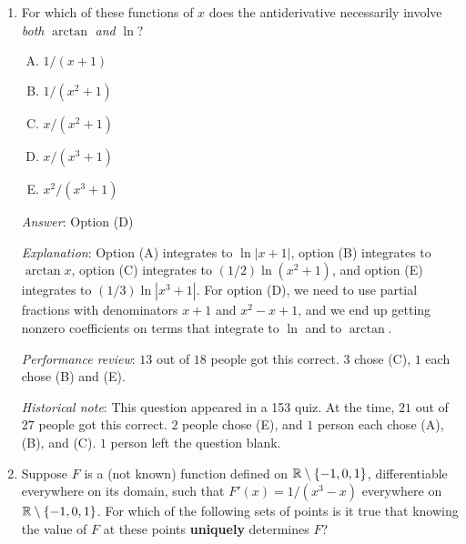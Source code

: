 \documentclass[10pt]{amsart}
\begin{document}
\begin{enumerate}
  {\em Performance review}: $6$ out of $18$ people got this
  correct. $3$ chose (A), $5$ chose (C), $2$ chose (E), $1$ chose (D),
  $1$ left the question blank.

  {\em Historical note}: This question appeared in a 153 quiz. At the
  time, $4$ out of $27$ people got this correct. $11$ people chose
  (A), $7$ people chose (C), $3$ people chose (D), $1$ person chose
  (E), and $1$ person left the question blank.

  Mainly, people confused the roles of the dummy variable $x$ (which
  gets integrated away) and the variable $k$.

\item For which of these functions of $x$ does the antiderivative
  necessarily involve {\em both} $\arctan$ {\em and} $\ln$?

  \begin{enumerate}[(A)]
  \item $1/(x + 1)$
  \item $1/(x^2 + 1)$
  \item $x/(x^2 + 1)$
  \item $x/(x^3 + 1)$
  \item $x^2/(x^3 + 1)$
  \end{enumerate}

  {\em Answer}: Option (D)

  {\em Explanation}: Option (A) integrates to $\ln|x+1|$, option (B)
  integrates to $\arctan x$, option (C) integrates to $(1/2) \ln(x^2 +
  1)$, and option (E) integrates to $(1/3) \ln|x^3 + 1|$. For option
  (D), we need to use partial fractions with denominators $x + 1$ and
  $x^2 - x + 1$, and we end up getting nonzero coefficients on terms
  that integrate to $\ln$ and to $\arctan$.

  {\em Performance review}: $13$ out of $18$ people got this
  correct. $3$ chose (C), $1$ each chose (B) and (E).

  {\em Historical note}: This question appeared in a 153 quiz. At the
  time, $21$ out of $27$ people got this correct. $2$ people chose (E),
  and $1$ person each chose (A), (B), and (C). $1$ person left the
  question blank.

\item Suppose $F$ is a (not known) function defined on $\mathbb{R} \setminus
  \{ -1,0,1\}$, differentiable everywhere on its domain, such that
  $F'(x) = 1/(x^3 - x)$ everywhere on $\mathbb{R} \setminus \{-1,0,1\}$. For
  which of the following sets of points is it true that knowing the
  value of $F$ at these points {\bf uniquely} determines $F$?


\end{enumerate}
\end{document}
